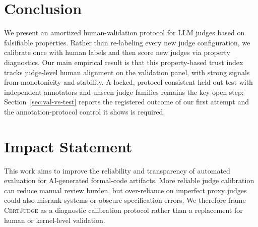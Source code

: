 \documentclass{article}
\begin{document}
\section{Conclusion}
We present an amortized human-validation protocol for LLM judges based on falsifiable properties.
Rather than re-labeling every new judge configuration, we calibrate once with human labels and then score new judges via property diagnostics.
Our main empirical result is that this property-based trust index tracks judge-level human alignment on the validation panel, with strong signals from monotonicity and stability.
A locked, protocol-consistent held-out test with independent annotators and unseen judge families remains the key open step; Section~\ref{sec:val-vs-test} reports the registered outcome of our first attempt and the annotation-protocol control it shows is required.

\section*{Impact Statement}
This work aims to improve the reliability and transparency of automated evaluation for AI-generated formal-code artifacts.
More reliable judge calibration can reduce manual review burden, but over-reliance on imperfect proxy judges could also misrank systems or obscure specification errors.
We therefore frame \textsc{CertJudge} as a diagnostic calibration protocol rather than a replacement for human or kernel-level validation.

\newpage





\end{document}
